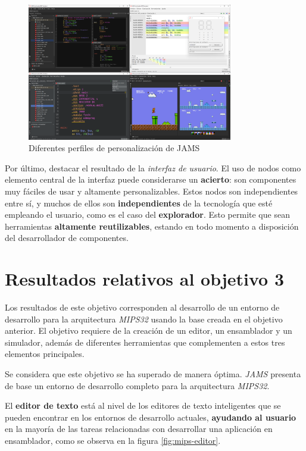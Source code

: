 \begin{figure}[h]
    \centering
    \includegraphics[width=0.8\textwidth]{images/result/jams-collage}
    \caption{Diferentes perfiles de personalización de JAMS}
    \label{fig:jams-collage}
\end{figure}

Por último, destacar el resultado de la \textit{interfaz de usuario}.
El uso de nodos como elemento central de la interfaz puede considerarse
un \textbf{acierto}: son componentes muy fáciles de usar y altamente personalizables.
Estos nodos son independientes entre sí, y muchos de ellos son \textbf{independientes}
de la tecnología que esté empleando el usuario, como es el caso del \textbf{explorador}.
Esto permite que sean herramientas \textbf{altamente reutilizables}, estando en todo
momento a disposición del desarrollador de componentes.


\section{Resultados relativos al objetivo 3}\label{sec:resultados-relativos-al-objetivo-3}

Los resultados de este objetivo corresponden al desarrollo
de un entorno de desarrollo para la arquitectura \textit{MIPS32}
usando la base creada en el objetivo anterior.
El objetivo requiere de la creación de un editor, un ensamblador
y un simulador, además de diferentes herramientas que complementen
a estos tres elementos principales.

Se considera que este objetivo se ha superado
de manera óptima.
\textit{JAMS} presenta de base un entorno de desarrollo completo
para la arquitectura \textit{MIPS32}.

El \textbf{editor de texto} está al nivel de los editores de texto
inteligentes que se pueden encontrar en los entornos de desarrollo
actuales, \textbf{ayudando al usuario} en la mayoría de las tareas
relacionadas con desarrollar una aplicación en ensamblador, como se observa
en la figura \ref{fig:mips-editor}.

